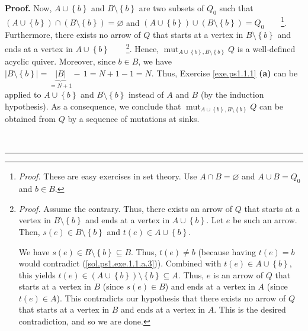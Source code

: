 \documentclass[numbers=enddot,12pt,final,onecolumn,notitlepage]{scrartcl}%
\newcounter{exer}
\numberwithin{exer}{section}
\theoremstyle{definition}
\newenvironment{proof}[1][Proof]{\noindent\textbf{#1.} }{\ \rule{0.5em}{0.5em}}
\begin{document}
\begin{proof}
Now, $A\cup\left\{  b\right\}  $ and $B\setminus\left\{  b\right\}  $ are two
subsets of $Q_{0}$ such that $\left(  A\cup\left\{  b\right\}  \right)
\cap\left(  B\setminus\left\{  b\right\}  \right)  =\varnothing$ and $\left(
A\cup\left\{  b\right\}  \right)  \cup\left(  B\setminus\left\{  b\right\}
\right)  =Q_{0}$\ \ \ \ \footnote{\textit{Proof.} These are easy exercises in
set theory. Use $A\cap B=\varnothing$ and $A\cup B=Q_{0}$ and $b\in B$.}.
Furthermore, there exists no arrow of $Q$ that starts at a vertex in
$B\setminus\left\{  b\right\}  $ and ends at a vertex in $A\cup\left\{
b\right\}  $\ \ \ \ \footnote{\textit{Proof.} Assume the contrary. Thus, there
exists an arrow of $Q$ that starts at a vertex in $B\setminus\left\{
b\right\}  $ and ends at a vertex in $A\cup\left\{  b\right\}  $. Let $e$ be
such an arrow. Then, $s\left(  e\right)  \in B\setminus\left\{  b\right\}  $
and $t\left(  e\right)  \in A\cup\left\{  b\right\}  $.
\par
We have $s\left(  e\right)  \in B\setminus\left\{  b\right\}  \subseteq B$.
Thus, $t\left(  e\right)  \neq b$ (because having $t\left(  e\right)  =b$
would contradict (\ref{sol.ps1.exe.1.1.a.3})). Combined with $t\left(
e\right)  \in A\cup\left\{  b\right\}  $, this yields $t\left(  e\right)
\in\left(  A\cup\left\{  b\right\}  \right)  \setminus\left\{  b\right\}
\subseteq A$. Thus, $e$ is an arrow of $Q$ that starts at a vertex in $B$
(since $s\left(  e\right)  \in B$) and ends at a vertex in $A$ (since
$t\left(  e\right)  \in A$). This contradicts our hypothesis that there exists
no arrow of $Q$ that starts at a vertex in $B$ and ends at a vertex in $A$.
This is the desired contradiction, and so we are done.}. Hence,
$\operatorname*{mut}\nolimits_{A\cup\left\{  b\right\}  ,B\setminus\left\{
b\right\}  }Q$ is a well-defined acyclic quiver. Moreover, since $b\in B$, we
have $\left\vert B\setminus\left\{  b\right\}  \right\vert
=\underbrace{\left\vert B\right\vert }_{=N+1}-\,1=N+1-1=N$. Thus, Exercise
\ref{exe.ps1.1.1} \textbf{(a)} can be applied to $A\cup\left\{  b\right\}  $
and $B\setminus\left\{  b\right\}  $ instead of $A$ and $B$ (by the induction
hypothesis). As a consequence, we conclude that $\operatorname*{mut}%
\nolimits_{A\cup\left\{  b\right\}  ,B\setminus\left\{  b\right\}  }Q$ can be
obtained from $Q$ by a sequence of mutations at sinks.


\end{proof}
\end{document}
